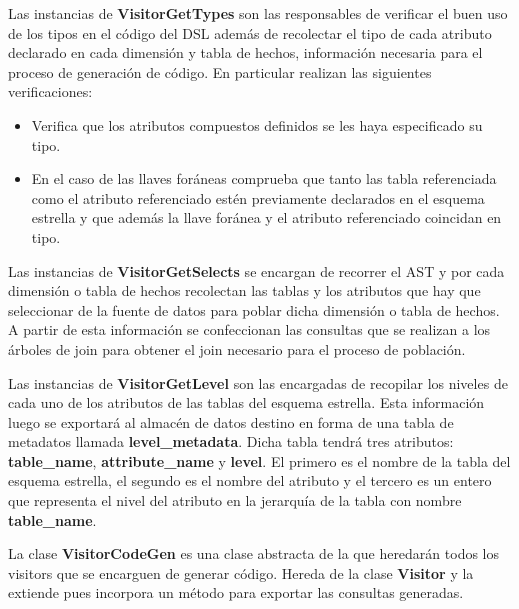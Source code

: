 Las instancias de \textbf{VisitorGetTypes} son las responsables de verificar el buen uso de los tipos en el 
c\'odigo del DSL adem\'as de recolectar el tipo de cada atributo declarado en cada dimensi\'on y 
tabla de hechos, 
informaci\'on necesaria para el proceso de generaci\'on de c\'odigo. En particular realizan 
las siguientes verificaciones: 

\begin{itemize}
    \item Verifica que los atributos compuestos definidos se les haya especificado su tipo.
    \item En el caso de las llaves for\'aneas comprueba que tanto las tabla referenciada como el atributo 
        referenciado est\'en previamente declarados en el esquema estrella y que adem\'as la llave for\'anea 
        y el atributo referenciado coincidan en tipo.
\end{itemize}

Las instancias de \textbf{VisitorGetSelects} se encargan de recorrer el AST y por cada dimensi\'on o tabla 
de hechos recolectan las tablas y los atributos que hay que seleccionar de la fuente de datos 
para poblar dicha dimensi\'on o tabla de hechos. A partir de esta informaci\'on se confeccionan las consultas 
que se realizan a los \'arboles de join para obtener el join necesario para el proceso de poblaci\'on.

Las instancias de \textbf{VisitorGetLevel} son las encargadas de recopilar los niveles de cada uno de los 
atributos de las tablas del esquema estrella. Esta informaci\'on luego se exportar\'a al almac\'en de datos 
destino en forma de una tabla de metadatos llamada \textbf{level\_metadata}. Dicha tabla tendr\'a tres atributos: 
\textbf{table\_name}, \textbf{attribute\_name} y \textbf{level}. El primero es el nombre de la tabla del esquema 
estrella, el segundo es el nombre del atributo y el tercero es un entero que representa el nivel del atributo 
en la jerarqu\'ia de la tabla con nombre \textbf{table\_name}.

La clase \textbf{VisitorCodeGen} es una clase abstracta de la que heredar\'an todos los visitors que 
se encarguen de generar c\'odigo. Hereda de la clase \textbf{Visitor} y la extiende pues incorpora un 
m\'etodo para exportar las consultas generadas.

